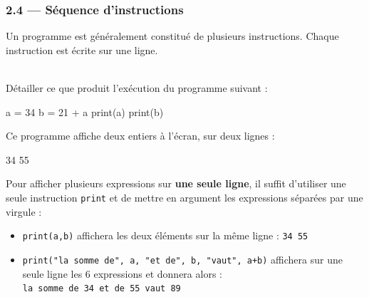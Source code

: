 \documentclass[a4paper,17pt]{extarticle}
\newenvironment{eleve}%
{\begin{activite}\color{noiramu}\\[-0.5cm]}
{\end{activite}}
\providecommand{\tightlist}{%
      \setlength{\itemsep}{0pt}\setlength{\parskip}{0pt}}
\newenvironment{Shaded}{}{}
\newcommand{\DecValTok}[1]{\textcolor[rgb]{0.25,0.63,0.44}{{#1}}}
\newcommand{\NormalTok}[1]{{#1}}
\newcommand{\OperatorTok}[1]{\textcolor[rgb]{0.40,0.40,0.40}{{#1}}}
\newcommand{\BuiltInTok}[1]{{#1}}
\begin{document}
    \hypertarget{suxe9quence-dinstructions}{%
\subsubsection{2.4 --- Séquence
d'instructions}\label{suxe9quence-dinstructions}}
\begin{retenir}
    Un programme est généralement constitué de plusieurs instructions.
Chaque instruction est écrite sur une ligne.

        \end{retenir}\begin{eleve}
    Détailler ce que produit l'exécution du programme suivant :

\begin{Shaded}
\begin{Highlighting}[]
\NormalTok{a }\OperatorTok{=} \DecValTok{34}
\NormalTok{b }\OperatorTok{=} \DecValTok{21} \OperatorTok{+}\NormalTok{ a}
\BuiltInTok{print}\NormalTok{(a)}
\BuiltInTok{print}\NormalTok{(b)}
\end{Highlighting}
\end{Shaded}
        
        \end{eleve}\begin{reponse}
    Ce programme affiche deux entiers à l'écran, sur deux lignes :

\begin{Shaded}
\begin{Highlighting}[]
\DecValTok{34}
\DecValTok{55}
\end{Highlighting}
\end{Shaded}

        \end{reponse}\begin{remarque}
    Pour afficher plusieurs expressions sur \textbf{une seule ligne}, il
suffit d'utiliser une seule instruction \texttt{print} et de mettre en
argument les expressions séparées par une virgule :

\begin{itemize}
\tightlist
\item
  \texttt{print(a,b)} affichera les deux éléments sur la même ligne :
  \texttt{34\ 55}
\item
  \texttt{print("la\ somme\ de",\ a,\ "et\ de",\ b,\ "vaut",\ a+b)}
  affichera sur une seule ligne les 6 expressions et donnera alors :
  \texttt{la\ somme\ de\ 34\ et\ de\ 55\ vaut\ 89}
\end{itemize}

        \end{remarque}
\end{document}
